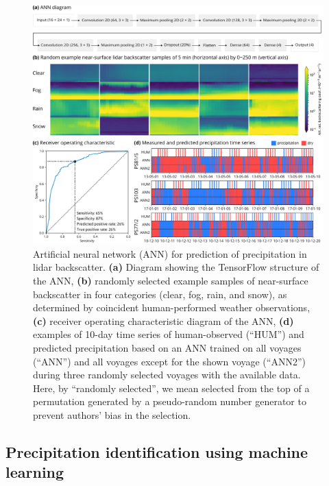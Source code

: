 \documentclass[draft]{agujournal2019}
\begin{document}
\begin{figure}[b!]
\centering
\includegraphics[width=\textwidth]{img/ann.pdf}
\caption{
Artificial neural network (ANN) for prediction of precipitation in lidar backscatter. \textbf{(a)} Diagram showing the TensorFlow structure of the ANN, \textbf{(b)} randomly selected example samples of near-surface backscatter in four categories (clear, fog, rain, and snow), as determined by coincident human-performed weather observations, \textbf{(c)} receiver operating characteristic diagram of the ANN, \textbf{(d)} examples of 10-day time series of human-observed (``HUM'') and predicted precipitation based on an ANN trained on all voyages (``ANN'') and all voyages except for the shown voyage (``ANN2'') during three randomly selected voyages with the available data. Here, by ``randomly selected'', we mean selected from the top of a permutation generated by a pseudo-random number generator to prevent authors' bias in the selection.
}
\label{fig:ann}
\end{figure}

\subsection{Precipitation identification using machine learning}
\label{sec:ann}
\end{document}
